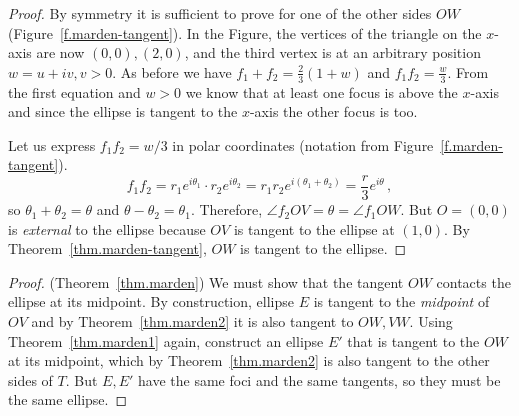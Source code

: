 \begin{proof}
By symmetry it is sufficient to prove for one of the other sides $OW$ (Figure~\ref{f.marden-tangent}). In the Figure, the vertices of the triangle on the $x$-axis are now $(0,0),(2,0)$, and the third vertex is at an arbitrary position $w=u+iv,v>0$. As before we have $f_1+f_2=\frac{2}{3}(1+w)$ and $f_1f_2=\frac{w}{3}$. From the first equation and $w>0$ we know that at least one focus is above the $x$-axis and since the ellipse is tangent to the $x$-axis the other focus is too.

Let us express $f_1f_2=w/3$ in polar coordinates (notation from Figure~\ref{f.marden-tangent}).
\[
f_1f_2=r_1e^{i\theta_1}\cdot r_2e^{i\theta_2}=r_1r_2e^{i(\theta_1+\theta_2)}=\frac{r}{3}e^{i\theta}\,,
\]
so $\theta_1+\theta_2=\theta$ and $\theta-\theta_2=\theta_1$. Therefore, $\angle f_2OV=\theta=\angle f_1OW$. But $O=(0,0)$ is \emph{external} to the ellipse because $OV$ is tangent to the ellipse at $(1,0)$. By Theorem~\ref{thm.marden-tangent}, $OW$ is tangent to the ellipse.\hqed
\end{proof}

\begin{proof} (Theorem~\ref{thm.marden})
We must show that the tangent $OW$ contacts the ellipse at its midpoint. By construction, ellipse $E$ is tangent to the \emph{midpoint} of $OV$ and by Theorem~\ref{thm.marden2} it is also tangent to $OW,VW$. Using Theorem~\ref{thm.marden1} again, construct an ellipse $E'$ that is tangent to the $OW$ at its midpoint, which by Theorem~\ref{thm.marden2} is also tangent to the other sides of $T$. But $E,E'$ have the same foci and the same tangents, so they must be the same ellipse.\hqed
\end{proof}



